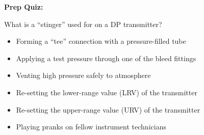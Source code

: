 \vfil \eject

\noindent
{\bf Prep Quiz:}

What is a ``stinger'' used for on a DP transmitter?

\begin{itemize}
\item{} Forming a ``tee'' connection with a pressure-filled tube
\vskip 5pt 
\item{} Applying a test pressure through one of the bleed fittings
\vskip 5pt 
\item{} Venting high pressure safely to atmosphere 
\vskip 5pt 
\item{} Re-setting the lower-range value (LRV) of the transmitter
\vskip 5pt 
\item{} Re-setting the upper-range value (URV) of the transmitter
\vskip 5pt 
\item{} Playing pranks on fellow instrument technicians
\end{itemize}





